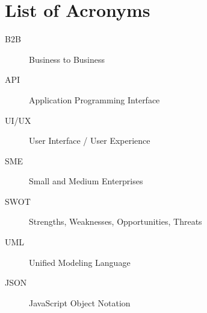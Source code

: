 \chapter*{List of Acronyms}

\begin{description}
    \item[B2B] Business to Business
    \item[API] Application Programming Interface
    \item[UI/UX] User Interface / User Experience
    \item[SME] Small and Medium Enterprises
    \item[SWOT] Strengths, Weaknesses, Opportunities, Threats
    \item[UML] Unified Modeling Language
    \item[JSON] JavaScript Object Notation
\end{description}

